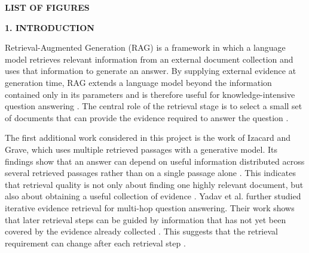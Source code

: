 \documentclass[12pt,a4paper]{report}
\newcommand{\fronttitle}[1]{
    \begin{center}
        {\fontsize{18}{21}\selectfont\bfseries #1\par}
    \end{center}
    \vspace{0.12in}
}
\begin{document}
\vspace{0.35in}
\fronttitle{LIST OF FIGURES}
\begin{center}
\renewcommand{\arraystretch}{1.45}
\end{center}
\clearpage


\setcounter{page}{1}

\fronttitle{1. INTRODUCTION}
\justifying

Retrieval-Augmented Generation (RAG) is a framework in which a language
model retrieves relevant information from an external document collection
and uses that information to generate an answer. By supplying external
evidence at generation time, RAG extends a language model beyond the
information contained only in its parameters and is therefore useful for
knowledge-intensive question answering \cite{lewis2020rag}. The central
role of the retrieval stage is to select a small set of documents that can
provide the evidence required to answer the question \cite{lewis2020rag}.

The first additional work considered in this project is the work of
Izacard and Grave, which uses multiple retrieved passages with a
generative model. Its findings show that an answer can depend on useful
information distributed across several retrieved passages rather than on
a single passage alone \cite{izacard2021fid}. This indicates that retrieval
quality is not only about finding one highly relevant document, but also
about obtaining a useful collection of evidence \cite{izacard2021fid}.
Yadav et al. further studied iterative evidence retrieval for multi-hop
question answering. Their work shows that later retrieval steps can be
guided by information that has not yet been covered by the evidence
already collected \cite{yadav2020iterative}. This suggests that the
retrieval requirement can change after each retrieval step \cite{yadav2020iterative}.
\end{document}
